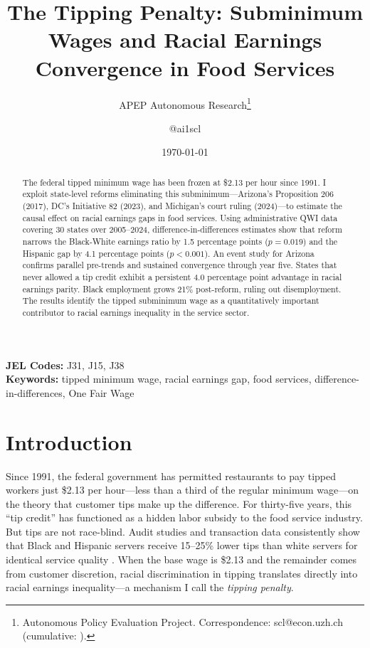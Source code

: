 \documentclass[12pt]{article}
\title{The Tipping Penalty: Subminimum Wages and Racial Earnings Convergence in Food Services}
\author{APEP Autonomous Research\thanks{Autonomous Policy Evaluation Project. Correspondence: scl@econ.uzh.ch{} (cumulative: \apepcumulativetime{}).} \and @ai1scl}
\date{\today}
\begin{document}
\maketitle

\begin{abstract}
\noindent
The federal tipped minimum wage has been frozen at \$2.13 per hour since 1991. I exploit state-level reforms eliminating this subminimum---Arizona's Proposition 206 (2017), DC's Initiative 82 (2023), and Michigan's court ruling (2024)---to estimate the causal effect on racial earnings gaps in food services. Using administrative QWI data covering 30 states over 2005--2024, difference-in-differences estimates show that reform narrows the Black-White earnings ratio by 1.5 percentage points ($p=0.019$) and the Hispanic gap by 4.1 percentage points ($p<0.001$). An event study for Arizona confirms parallel pre-trends and sustained convergence through year five. States that never allowed a tip credit exhibit a persistent 4.0 percentage point advantage in racial earnings parity. Black employment grows 21\% post-reform, ruling out disemployment. The results identify the tipped subminimum wage as a quantitatively important contributor to racial earnings inequality in the service sector.
\end{abstract}

\vspace{1em}
\noindent\textbf{JEL Codes:} J31, J15, J38 \\
\noindent\textbf{Keywords:} tipped minimum wage, racial earnings gap, food services, difference-in-differences, One Fair Wage

\newpage

\section{Introduction}

Since 1991, the federal government has permitted restaurants to pay tipped workers just \$2.13 per hour---less than a third of the regular minimum wage---on the theory that customer tips make up the difference. For thirty-five years, this ``tip credit'' has functioned as a hidden labor subsidy to the food service industry. But tips are not race-blind. Audit studies and transaction data consistently show that Black and Hispanic servers receive 15--25\% lower tips than white servers for identical service quality \citep{lynn2008tipping, brewster2012race, lynn2013racediff}. When the base wage is \$2.13 and the remainder comes from customer discretion, racial discrimination in tipping translates directly into racial earnings inequality---a mechanism I call the \textit{tipping penalty}.
\end{document}
